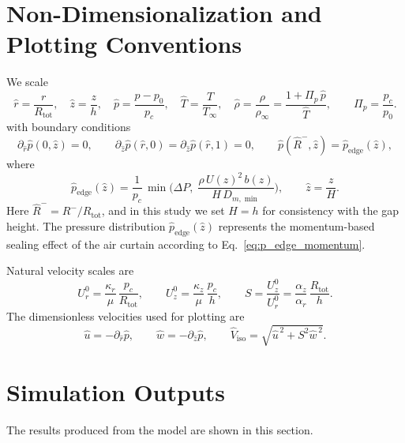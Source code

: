 \documentclass[11pt,a4paper]{article}
\begin{document}
\section{Non-Dimensionalization and Plotting Conventions}
\label{sec:non-dimensionalization-and-plotting-conventions}

We scale
\begin{equation}
  \hat r=\frac{r}{R_{\mathrm{tot}}},\quad
  \hat z=\frac{z}{h},\quad
  \hat p=\frac{p-p_0}{p_c},\quad
  \hat T=\frac{T}{T_\infty},\quad
  \hat\rho=\frac{\rho}{\rho_\infty}
  =\frac{1+\Pi_p\,\hat p}{\hat T},\qquad
  \Pi_p=\frac{p_c}{p_0}.
\end{equation}
with boundary conditions
\begin{equation}
  \partial_{\hat r}\hat p(0,\hat z)=0, \qquad
  \partial_{\hat z}\hat p(\hat r,0)=\partial_{\hat z}\hat p(\hat r,1)=0, \qquad
  \hat p(\hat R^{-},\hat z)=\hat p_{\mathrm{edge}}(\hat z),
\end{equation}
where
\begin{equation}
  \hat p_{\mathrm{edge}}(\hat z)
  =\frac{1}{p_c}\,
   \min\!\Big(
      \Delta P,\;
      \frac{\rho\,U(z)^2\,b(z)}{H\,D_{m,\min}}
    \Big),
  \qquad
  \hat z=\frac{z}{H}.
\end{equation}
Here $\hat R^{-}=R^{-}/R_{\mathrm{tot}}$, and in this study we set $H=h$
for consistency with the gap height.  The pressure distribution
$\hat p_{\mathrm{edge}}(\hat z)$ represents the momentum-based
sealing effect of the air curtain according to
Eq.~\eqref{eq:p_edge_momentum}.

Natural velocity scales are
\begin{equation}
  U_r^0=\frac{\kappa_r}{\mu}\,\frac{p_c}{R_{\mathrm{tot}}},\qquad
  U_z^0=\frac{\kappa_z}{\mu}\,\frac{p_c}{h},\qquad
  S=\frac{U_z^0}{U_r^0}
  =\frac{\alpha_z}{\alpha_r}\,\frac{R_{\mathrm{tot}}}{h}.
\end{equation}
The dimensionless velocities used for plotting are
\begin{equation}
  \hat u=-\partial_{\hat r}\hat p,\qquad
  \hat w=-\partial_{\hat z}\hat p,\qquad
  \hat V_{\mathrm{iso}}=\sqrt{\hat u^{\,2}+S^{2}\hat w^{\,2}}.
\end{equation}

\section{Simulation Outputs}
\label{sec:simulation-outputs}

The results produced from the model are shown in this section.
\end{document}
